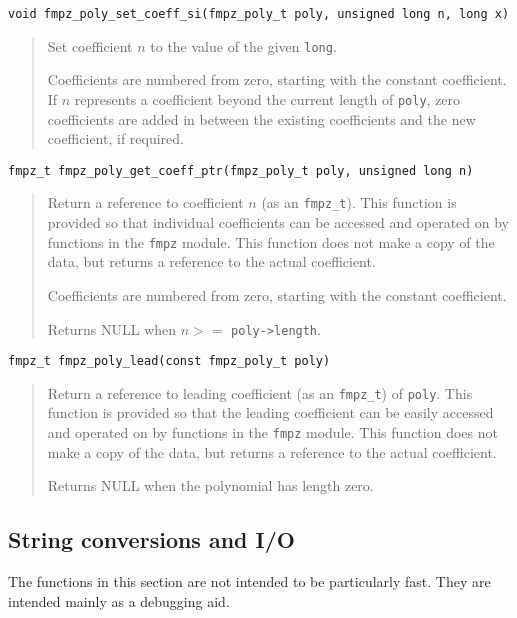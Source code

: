 \documentclass[a4paper,10pt]{article}
\newcommand{\code}{\lstinline}
\begin{document}
\begin{lstlisting}
void fmpz_poly_set_coeff_si(fmpz_poly_t poly, unsigned long n, long x) 
\end{lstlisting}
\begin{quote}
Set coefficient $n$ to the value of the given \code{long}. 

Coefficients are numbered from zero, starting with the constant coefficient. If $n$ represents a coefficient beyond the current length of \code{poly}, zero coefficients are added in between the existing coefficients and the new coefficient, if required.
\end{quote}

\begin{lstlisting}
fmpz_t fmpz_poly_get_coeff_ptr(fmpz_poly_t poly, unsigned long n)
\end{lstlisting}
\begin{quote}
Return a reference to coefficient $n$ (as an \code{fmpz_t}). This function is provided so that individual coefficients can be accessed and operated on by functions in the \code{fmpz} module. This function does not make a copy of the data, but returns a reference to the actual coefficient.

Coefficients are numbered from zero, starting with the constant coefficient. 

Returns NULL when $n >= $ \code{poly->length}. 
\end{quote}

\begin{lstlisting}
fmpz_t fmpz_poly_lead(const fmpz_poly_t poly)
\end{lstlisting}
\begin{quote}
Return a reference to leading coefficient (as an \code{fmpz_t}) of \code{poly}. This function is provided so that the leading coefficient can be easily accessed and operated on by functions in the \code{fmpz} module. This function does not make a copy of the data, but returns a reference to the actual coefficient.

Returns NULL when the polynomial has length zero. 
\end{quote}

\subsection{String conversions and I/O}

The functions in this section are not intended to be particularly fast. They are intended mainly as a debugging aid.
\end{document}
